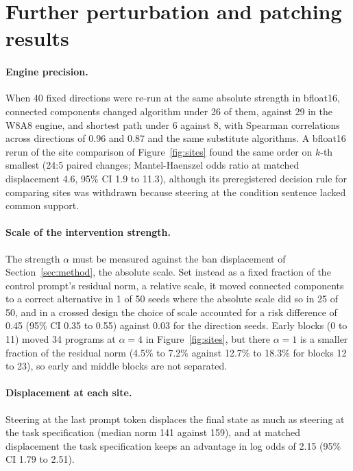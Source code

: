 \documentclass[11pt,letterpaper]{article}
\begin{document}
\section{Further perturbation and patching results}
\label{app:controls}

\paragraph{Engine precision.} When 40 fixed directions were re-run at the same absolute strength in bfloat16, connected components changed algorithm under 26 of them, against 29 in the W8A8 engine, and shortest path under 6 against 8, with Spearman correlations across directions of 0.96 and 0.87 and the same substitute algorithms. A bfloat16 rerun of the site comparison of Figure~\ref{fig:sites} found the same order on $k$-th smallest (24:5 paired changes; Mantel-Haenszel odds ratio at matched displacement 4.6, 95\% CI 1.9 to 11.3), although its preregistered decision rule for comparing sites was withdrawn because steering at the condition sentence lacked common support.

\paragraph{Scale of the intervention strength.} The strength $\alpha$ must be measured against the ban displacement of Section~\ref{sec:method}, the absolute scale. Set instead as a fixed fraction of the control prompt's residual norm, a relative scale, it moved connected components to a correct alternative in 1 of 50 seeds where the absolute scale did so in 25 of 50, and in a crossed design the choice of scale accounted for a risk difference of 0.45 (95\% CI 0.35 to 0.55) against 0.03 for the direction seeds. Early blocks (0 to 11) moved 34 programs at $\alpha = 4$ in Figure~\ref{fig:sites}, but there $\alpha = 1$ is a smaller fraction of the residual norm (4.5\% to 7.2\% against 12.7\% to 18.3\% for blocks 12 to 23), so early and middle blocks are not separated.

\paragraph{Displacement at each site.} Steering at the last prompt token displaces the final state as much as steering at the task specification (median norm 141 against 159), and at matched displacement the task specification keeps an advantage in log odds of 2.15 (95\% CI 1.79 to 2.51).
\end{document}
